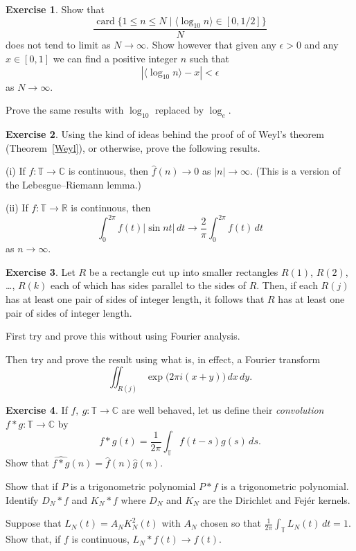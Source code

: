 \documentclass[12pt]{article}
\theoremstyle{definition}
\newtheorem{question}{Exercise}[section]
\newcommand{\card}{\operatorname{card}}
\begin{document}
\begin{question} Show that
\[\frac{\card\{1\leq n\leq N \mid \langle \log_{10}n\rangle
\in [0,1/2]\}}{N}\]
does not tend to limit as $N\rightarrow\infty$. Show
however that given any $\epsilon>0$ and any $x\in[0,1]$
we can find a positive integer $n$ such that
\[|\langle \log_{10}n\rangle-x|<\epsilon\]
as $N\rightarrow\infty$. 

Prove the same results with $\log_{10}$ replaced by $\log_{e}$.
\end{question}
\begin{question} Using the kind of ideas behind
the proof of of Weyl's theorem (Theorem~\ref{Weyl}),
or otherwise, prove the following results.

(i) If $f:{\mathbb T}\rightarrow{\mathbb C}$
is continuous, then $\hat{f}(n)\rightarrow 0$
as $|n|\rightarrow\infty$. (This is a version of
the Lebesgue--Riemann lemma.)

(ii) If $f:{\mathbb T}\rightarrow{\mathbb R}$
is continuous, then
\[\int_{0}^{2\pi}f(t)|\sin nt|\,dt
\rightarrow \frac{2}{\pi}\int_{0}^{2\pi}f(t)\,dt\]
as $n\rightarrow\infty$.
\end{question}
\begin{question} Let $R$ be a rectangle cut up into
smaller rectangles $R(1)$, $R(2)$, \dots, $R(k)$ 
each of which has sides parallel to the sides of $R$.
Then, if each $R(j)$ has at least one pair of sides
of integer length, it follows that $R$ has 
at least one pair of sides of integer length.

First try and prove this without using Fourier analysis.

Then try and prove the result using what is, in effect,
a Fourier transform
\[\iint_{R(j)}\exp\big(2\pi i(x+y)\big)\,dx\,dy.\]
\end{question} 
\begin{question}If $f,\ g:{\mathbb T}\rightarrow{\mathbb C}$
are well behaved, let us define their \emph{convolution}
$f*g:{\mathbb T}\rightarrow{\mathbb C}$ by
\[f*g(t)=\frac{1}{2\pi}\int_{\mathbb T}f(t-s)g(s)\,ds.\]
Show that 
$\widehat{f*g}(n)=\hat{f}(n)\hat{g}(n)$.

Show that if $P$ is a trigonometric polynomial
$P*f$ is a trigonometric polynomial. Identify
$D_{N}*f$ and $K_{N}*f$ where $D_{N}$ and $K_{N}$
are the Dirichlet and Fej\'{e}r kernels.

Suppose that $L_{N}(t)=A_{N}K_{N}^{2}(t)$ with
$A_{N}$ chosen so that $\frac{1}{2\pi}\int_{\mathbb T}L_{N}(t)\,dt=1$.
Show that, if $f$ is continuous, $L_{N}*f(t)\rightarrow f(t)$. 
\end{question} 
\end{document}
